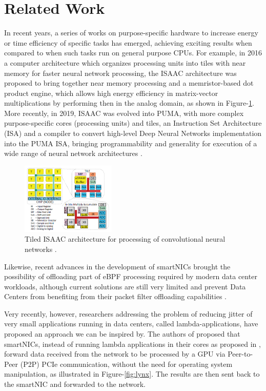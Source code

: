 \documentclass[conference]{IEEEtran}
\begin{document}
\section{Related Work}
\label{sec:rel-works}

In recent years, a series of works on purpose-specific hardware to increase energy or time efficiency of specific tasks has emerged, achieving exciting results when compared to when such tasks run on general purpose CPUs. For example, in 2016 a computer architecture which organizes processing units into tiles with near memory for faster neural network processing, the ISAAC \cite{shafiee2016isaac} architecture was proposed to bring together near memory processing and a memristor-based dot product engine, which allows high energy efficiency in matrix-vector multiplications by performing then in the analog domain, as shown in Figure-\ref{fig:isaac}. More recently, in 2019, ISAAC was evolved into PUMA, with more complex purpose-specific cores (processing units) and tiles, an Instruction Set Architecture (ISA) and a compiler to convert high-level Deep Neural Networks implementation into the PUMA ISA, bringing programmability and generality for execution of a wide range of neural network architectures \cite{ankit2019puma}.

\begin{figure}[h]
    \centering
    \includegraphics[width=0.4\textwidth]{figures/isaac.png}
    \caption{Tiled ISAAC architecture for processing of convolutional neural networks \cite{shafiee2016isaac}.}
    \label{fig:isaac}
\end{figure}

Likewise, recent advances in the development of smartNICs brought the possibility of offloading part of eBPF processing required by modern data center workloads, although current solutions are still very limited and prevent Data Centers from benefiting from their packet filter offloading capabilities \cite{miano:2019:smartnics-ddos}.

Very recently, however, researchers addressing the problem of reducing jitter of very small applications running in data centers, called lambda-applications, have proposed an approach we can be inspired by. The authors of \cite{tork:2020:lynx} proposed that smartNICs, instead of running lambda applications in their cores as proposed in \cite{choi:2019:lambda-nic}, forward data received from the network to be processed by a GPU via Peer-to-Peer (P2P) PCIe communication, without the need for operating system manipulation, as illustrated in Figure-\ref{fig:lynx}. The results are then sent back to the smartNIC and forwarded to the network.
\end{document}
